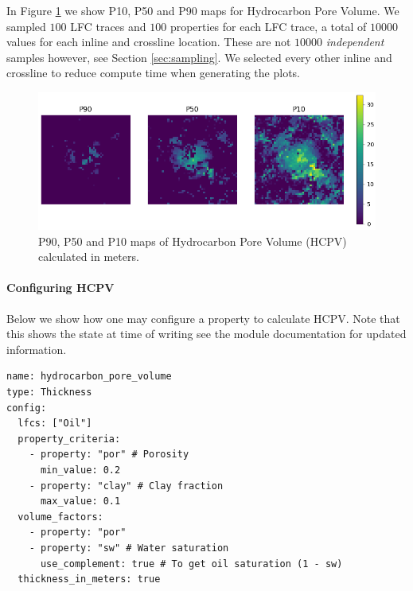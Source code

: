 \documentclass[note,screen,english,12pt,utf8]{nrdoc}
\begin{document}
In Figure \ref{fig:hydrocarbon_pore_volume_maps} we show P10, P50 and P90 maps for
Hydrocarbon Pore Volume. We sampled $100$ LFC traces and $100$ properties for each
LFC trace, a total of $10000$ values for each inline and crossline location.
These are not $10000$ \textit{independent} samples however, see Section \ref{sec:sampling}.
We selected every other inline and
crossline to reduce compute time when generating the plots.

\begin{figure}[h]
    \centering
    \includegraphics[width=\textwidth]{figures/hydrocarbon_pore_volume_meter_p90_p50_p10.png}
    \caption{P90, P50 and P10 maps of Hydrocarbon Pore Volume (HCPV) calculated in meters.}
    \label{fig:hydrocarbon_pore_volume_maps}
\end{figure}


\paragraph{Configuring HCPV}

Below we show how one may configure a property to calculate HCPV. Note that
this shows the state at time of writing see the module documentation for
updated information.
\begin{verbatim}
name: hydrocarbon_pore_volume
type: Thickness
config:
  lfcs: ["Oil"]
  property_criteria:
    - property: "por" # Porosity
      min_value: 0.2
    - property: "clay" # Clay fraction
      max_value: 0.1
  volume_factors:
    - property: "por"
    - property: "sw" # Water saturation
      use_complement: true # To get oil saturation (1 - sw)
  thickness_in_meters: true
\end{verbatim}
\end{document}

